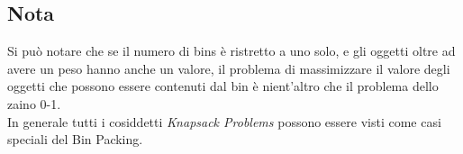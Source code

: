 \subsection{Nota}
Si può notare che se il numero di bins è ristretto a uno solo, e gli oggetti oltre ad avere un peso hanno anche un valore, il 
problema di massimizzare il valore degli oggetti che possono essere contenuti dal bin è nient'altro che il problema dello zaino 0-1. \\
In generale tutti i cosiddetti \textit{Knapsack Problems} possono essere visti come casi speciali del Bin Packing.
